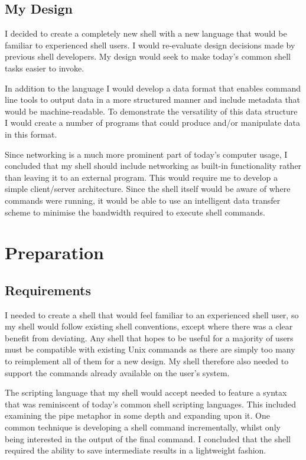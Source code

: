 \documentclass[12pt,twoside,notitlepage]{report}
\begin{document}
\section{My Design}
I decided to create a completely new shell with a new
language that would be familiar to experienced shell users. I would
re-evaluate design decisions made by previous shell developers. My
design would seek to make today's common shell tasks easier to invoke.

In addition to the language I would develop a data format that enables
command line tools to output data in a more structured manner and
include metadata that would be machine-readable. To demonstrate the
versatility of this data structure I would create a number of programs
that could produce and/or manipulate data in this format.

Since networking is a much more prominent part of today's computer
usage, I concluded that my shell should include networking as built-in
functionality rather than leaving it to an external program. This
would require me to develop a simple client/server architecture. Since
the shell itself would be aware of where commands were running, it
would be able to use an intelligent data transfer scheme to minimise
the bandwidth required to execute shell commands.

\cleardoublepage

\chapter{Preparation}

\section{Requirements}
I needed to create a shell that would feel familiar to an experienced
shell user, so my shell would follow existing shell conventions,
except where there was a clear benefit from deviating. Any shell that
hopes to be useful for a majority of users must be compatible with
existing Unix commands as there are simply too many to reimplement all
of them for a new design. My shell therefore also needed to support
the commands already available on the user's system.

The scripting language that my shell would accept needed to feature a
syntax that was reminiscent of today's common shell scripting
languages. This included examining the pipe metaphor in some depth and
expanding upon it. One common technique is developing a shell command
incrementally, whilst only being interested in the output of the final
command. I concluded that the shell required the ability to save
intermediate results in a lightweight fashion.
\end{document}

